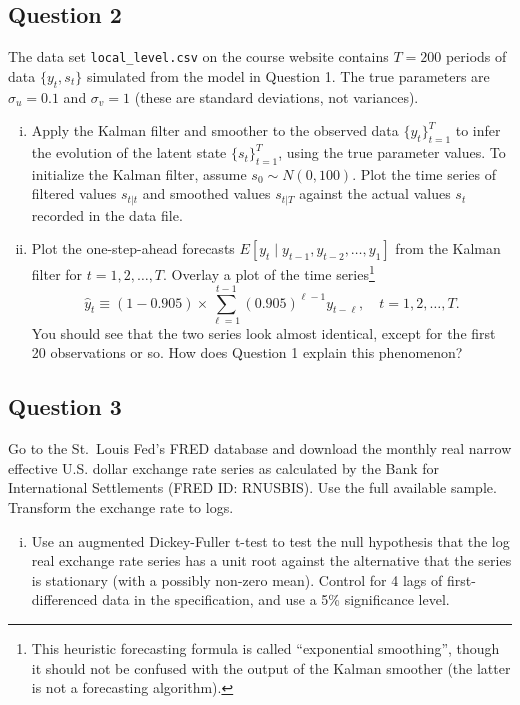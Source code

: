 \documentclass[12pt]{article}
\theoremstyle{plain}
\begin{document}
\subsection*{Question 2}
The data set {\tt local\_level.csv} on the course website contains $T=200$ periods of data $\lbrace y_t,s_t\rbrace$ simulated from the model in Question 1. The true parameters are $\sigma_u=0.1$ and $\sigma_v=1$ (these are standard deviations, not variances).

\begin{enumerate}[i)]
\item Apply the Kalman filter and smoother to the observed data $\lbrace y_t \rbrace_{t=1}^T$ to infer the evolution of the latent state $\lbrace s_t \rbrace_{t=1}^T$, using the true parameter values. To initialize the Kalman filter, assume $s_0 \sim N(0,100)$. Plot the time series of filtered values $s_{t|t}$ and smoothed values $s_{t|T}$ against the actual values $s_t$ recorded in the data file.

\item Plot the one-step-ahead forecasts $E[y_t \mid y_{t-1},y_{t-2},\dots,y_1]$ from the Kalman filter for $t=1,2,\dots,T$. Overlay a plot of the time series\footnote{This heuristic forecasting formula is called ``exponential smoothing'', though it should not be confused with the output of the Kalman smoother (the latter is not a forecasting algorithm).}
\[\hat{y}_t \equiv (1- 0.905) \times \sum_{\ell=1}^{t-1} (0.905)^{\ell-1} y_{t-\ell},\quad t=1,2,\dots,T.\]
You should see that the two series look almost identical, except for the first 20 observations or so. How does Question 1 explain this phenomenon?
\end{enumerate}

\subsection*{Question 3}
Go to the St.\ Louis Fed's FRED database and download the monthly real narrow effective U.S. dollar exchange rate series as calculated by the Bank for International Settlements (FRED ID: RNUSBIS). Use the full available sample. Transform the exchange rate to logs.

\begin{enumerate}[i)]
\item Use an augmented Dickey-Fuller t-test to test the null hypothesis that the log real exchange rate series has a unit root against the alternative that the series is stationary (with a possibly non-zero mean). Control for 4 lags of first-differenced data in the specification, and use a 5\% significance level.
\end{enumerate}
\end{document}
